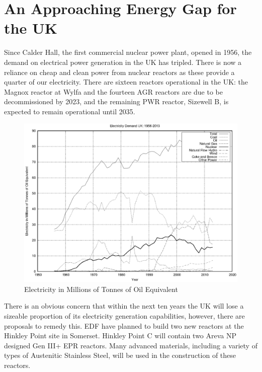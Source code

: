 \section{An Approaching Energy Gap for the UK}

Since Calder Hall, the first commercial nuclear power plant, opened in 1956, the demand on electrical power generation in the UK has tripled.  There is now a reliance on cheap and clean power from nuclear reactors as these provide a quarter of our electricity.  There are sixteen reactors operational in the UK:  the Magnox reactor at Wylfa and the fourteen AGR reactors are due to be decommissioned by 2023\cite{gen4}, and the remaining PWR reactor, Sizewell B, is expected to remain operational until 2035\cite{gen4}.

\begin{figure}[tbp]
  \begin{center}
    \includegraphics[width=15.0cm]{chapters/introduction/plots/elec_demand/elec_demand.eps}
    \caption{Electricity in Millions of Tonnes of Oil Equivalent}
    \label{fig:electricityusagesuk}
  \end{center}
\end{figure}

There is an obvious concern that within the next ten years the UK will lose a sizeable proportion of its electricity generation capabilities, however, there are proposals to remedy this.  EDF have planned to build two new reactors at the Hinkley Point site in Somerset.  Hinkley Point C will contain two Areva NP designed Gen III+ EPR reactors.  Many advanced materials, including a variety of types of Austenitic Stainless Steel, will be used in the construction of these reactors. 

